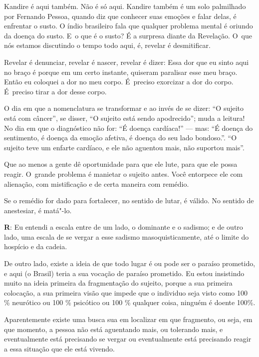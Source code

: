  

Kandire é aqui também. Não é só aqui. Kandire também é um solo
palmilhado por Fernando Pessoa, quando diz que conhecer suas emoções e
falar delas, é enfrentar o susto. O índio brasileiro fala que qualquer
problema mental é oriundo da doença do susto. E~o que é o susto? É a
surpresa diante da Revelação. O~que nós estamos discutindo o tempo todo
aqui, é, revelar é desmitificar.

 

Revelar é denunciar, revelar é nascer, revelar é dizer: Essa dor que eu
sinto aqui no braço é porque em um certo instante, quiseram paralisar
esse meu braço. Então eu coloquei a dor no meu corpo. É~preciso
exorcizar a dor do corpo. É~preciso tirar a dor desse corpo.

 

O dia em que a nomenclatura se transformar e ao invés de se dizer: ``O
sujeito está com câncer'', se disser, ``O sujeito está sendo
apodrecido''; muda a leitura! No dia em que o diagnóstico não for: ``É
doença cardíaca!'' --- mas: ``É doença do sentimento, é doença da emoção
afetiva, é doença do seu lado bondoso.''. ``O sujeito teve um enfarte
cardíaco, e ele não aguentou mais, não suportou mais''.

Que ao menos a gente dê oportunidade para que ele lute, para que ele
possa reagir. O~grande problema é manietar o sujeito antes. Você
entorpece ele com alienação, com mistificação e de certa maneira com
remédio.

 

Se o remédio for dado para fortalecer, no sentido de lutar, é válido. No
sentido de anestesiar, é matá"-lo.

 

\textbf{R}: Eu entendi a escala entre de um lado, o dominante e o
sadismo; e de outro lado, uma escala de se vergar a esse sadismo
masoquisticamente, até o limite do hospício e da cadeia.

 

De outro lado, existe a ideia de que todo lugar é ou pode ser o paraíso
prometido, e aqui (o Brasil) teria a sua vocação de paraíso prometido.
Eu estou insistindo muito na ideia primeira da fragmentação do
sujeito, porque a sua primeira colocação, a sua primeira visão que
impede que o individuo seja visto como 100 \% neurótico ou 100 \%
psicótico ou 100 \% qualquer coisa, ninguém é doente 100\%.

 

Aparentemente existe uma busca sua em localizar em que fragmento, ou
seja, em que momento, a pessoa não está aguentando mais, ou tolerando
mais, e eventualmente está precisando se vergar ou eventualmente está
precisando reagir a essa situação que ele está vivendo.

